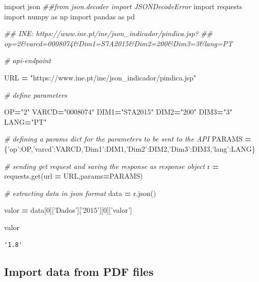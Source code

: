 \documentclass[
  12pt,
]{article}
\newenvironment{Shaded}{\begin{snugshade}}{\end{snugshade}}
\newcommand{\CommentTok}[1]{\textcolor[rgb]{0.56,0.35,0.01}{\textit{#1}}}
\newcommand{\DecValTok}[1]{\textcolor[rgb]{0.00,0.00,0.81}{#1}}
\newcommand{\ImportTok}[1]{#1}
\newcommand{\NormalTok}[1]{#1}
\newcommand{\OperatorTok}[1]{\textcolor[rgb]{0.81,0.36,0.00}{\textbf{#1}}}
\newcommand{\StringTok}[1]{\textcolor[rgb]{0.31,0.60,0.02}{#1}}
\begin{document}
\begin{Shaded}
\begin{Highlighting}[]
\ImportTok{import}\NormalTok{ json}
\CommentTok{##from json.decoder import JSONDecodeError}
\ImportTok{import}\NormalTok{ requests}
\ImportTok{import}\NormalTok{ numpy }\ImportTok{as}\NormalTok{ np}
\ImportTok{import}\NormalTok{ pandas }\ImportTok{as}\NormalTok{ pd}

\CommentTok{## INE: https://www.ine.pt/ine/json_indicador/pindica.jsp?}
\CommentTok{## op=2&varcd=0008074&Dim1=S7A2015&Dim2=200&Dim3=3&lang=PT}

\CommentTok{# api-endpoint }

\NormalTok{URL }\OperatorTok{=} \StringTok{"https://www.ine.pt/ine/json_indicador/pindica.jsp"}
  
\CommentTok{# define parameters}

\NormalTok{OP}\OperatorTok{=}\StringTok{"2"}
\NormalTok{VARCD}\OperatorTok{=}\StringTok{"0008074"}
\NormalTok{DIM1}\OperatorTok{=}\StringTok{"S7A2015"}
\NormalTok{DIM2}\OperatorTok{=}\StringTok{"200"}
\NormalTok{DIM3}\OperatorTok{=}\StringTok{"3"}
\NormalTok{LANG}\OperatorTok{=}\StringTok{"PT"}


\CommentTok{# defining a params dict for the parameters to be sent to the API }
\NormalTok{PARAMS }\OperatorTok{=}\NormalTok{ \{}\StringTok{'op'}\NormalTok{:OP,}\StringTok{'varcd'}\NormalTok{:VARCD,}\StringTok{'Dim1'}\NormalTok{:DIM1,}\StringTok{'Dim2'}\NormalTok{:DIM2,}\StringTok{'Dim3'}\NormalTok{:DIM3,}\StringTok{'lang'}\NormalTok{:LANG\} }
  
\CommentTok{# sending get request and saving the response as response object }
\NormalTok{r }\OperatorTok{=}\NormalTok{ requests.get(url }\OperatorTok{=}\NormalTok{ URL,params}\OperatorTok{=}\NormalTok{PARAMS) }
  
\CommentTok{# extracting data in json format }
\NormalTok{data }\OperatorTok{=}\NormalTok{ r.json() }

\NormalTok{valor }\OperatorTok{=}\NormalTok{ data[}\DecValTok{0}\NormalTok{][}\StringTok{'Dados'}\NormalTok{][}\StringTok{'2015'}\NormalTok{][}\DecValTok{0}\NormalTok{][}\StringTok{'valor'}\NormalTok{]}

\NormalTok{valor}
\end{Highlighting}
\end{Shaded}

\begin{verbatim}
'1.8'
\end{verbatim}

\hypertarget{import-data-from-pdf-files}{%
\subsection{Import data from PDF files}\label{import-data-from-pdf-files}}
\end{document}
